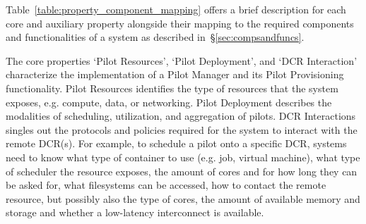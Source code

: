\documentclass{sig-alternate}
\begin{document}
Table~\ref{table:property_component_mapping} offers a brief description for each
core and auxiliary property alongside their mapping to the required components
and functionalities of a \pilot system as described
in~\S\ref{sec:compsandfuncs}.


 

The core properties `Pilot Resources', `Pilot Deployment', and `DCR Interaction'
characterize the implementation of a Pilot Manager and its Pilot Provisioning
functionality. Pilot Resources identifies the type of resources that the \pilot
system exposes, e.g. compute, data, or networking. Pilot Deployment describes
the modalities of scheduling, utilization, and aggregation of pilots.
DCR Interactions singles out the protocols and policies required for
the \pilot system to interact with the remote DCR(s). For example, to
schedule a pilot onto a specific DCR, \pilot systems need to know
what type of container to use (e.g. job, virtual machine), what type of
scheduler the resource exposes, the amount of cores and for how long they can be
asked for, what filesystems can be accessed, how to contact the remote resource,
but possibly also the type of cores, the amount of available memory and storage
and whether a low-latency interconnect is available.
\end{document}
